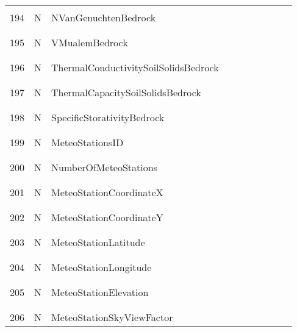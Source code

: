 \begin{longtable}{|c|c|l|c|c|c|c|p{}|c|p{}|}
&&&&&&&&&\\\hline%
&&&&&&&&&\\
194 & N & NVanGenuchtenBedrock & & & & & & & \\
&&&&&&&&&\\\hline%
&&&&&&&&&\\
195 & N & VMualemBedrock & & & & & & & \\
&&&&&&&&&\\\hline%
&&&&&&&&&\\
196 & N & ThermalConductivitySoilSolidsBedrock & & & & & & & \\
&&&&&&&&&\\\hline%
&&&&&&&&&\\
197 & N & ThermalCapacitySoilSolidsBedrock & & & & & & & \\
&&&&&&&&&\\\hline%
&&&&&&&&&\\
198 & N & SpecificStorativityBedrock & & & & & & & \\
&&&&&&&&&\\\hline%
&&&&&&&&&\\
199 & N & MeteoStationsID & & & & & & & \\
&&&&&&&&&\\\hline%
&&&&&&&&&\\
200 & N & NumberOfMeteoStations & & & & & & & \\
&&&&&&&&&\\\hline%
&&&&&&&&&\\
201 & N & MeteoStationCoordinateX & & & & & & & \\
&&&&&&&&&\\\hline%
&&&&&&&&&\\
202 & N & MeteoStationCoordinateY & & & & & & & \\
&&&&&&&&&\\\hline%
&&&&&&&&&\\
203 & N & MeteoStationLatitude & & & & & & & \\
&&&&&&&&&\\\hline%
&&&&&&&&&\\
204 & N & MeteoStationLongitude & & & & & & & \\
&&&&&&&&&\\\hline%
&&&&&&&&&\\
205 & N & MeteoStationElevation & & & & & & & \\
&&&&&&&&&\\\hline%
&&&&&&&&&\\
206 & N & MeteoStationSkyViewFactor & & & & & & & \\

\end{longtable}
